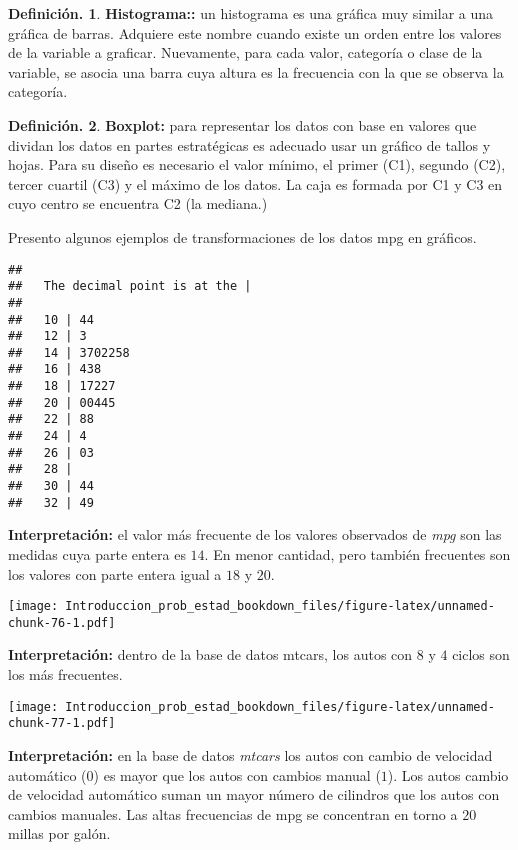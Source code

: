 \documentclass[]{book}
\theoremstyle{definition}
\newtheorem{definition}{Definición.}[chapter]
\theoremstyle{definition}
\theoremstyle{definition}
\theoremstyle{remark}
\begin{document}
\begin{definition}
\protect\hypertarget{def:unnamed-chunk-73}{}{\label{def:unnamed-chunk-73} }\textbf{Histograma::} un histograma es una gráfica muy similar a una
gráfica de barras. Adquiere este nombre cuando existe un orden
entre los valores de la variable a graficar. Nuevamente, para cada
valor, categoría o clase de la variable, se asocia una barra
cuya altura es la frecuencia con la que se observa la
categoría.
\end{definition}

\begin{definition}
\protect\hypertarget{def:unnamed-chunk-74}{}{\label{def:unnamed-chunk-74} }\textbf{Boxplot:} para representar los datos con base en valores que
dividan los datos en partes estratégicas es
adecuado usar un gráfico de tallos y hojas. Para su
diseño es necesario el valor mínimo, el primer
(C1), segundo (C2), tercer cuartil (C3) y el máximo de
los datos. La caja es formada por C1 y C3
en cuyo centro se encuentra C2 (la mediana.)
\end{definition}

Presento algunos ejemplos de transformaciones de los datos mpg en
gráficos.

\begin{verbatim}
## 
##   The decimal point is at the |
## 
##   10 | 44
##   12 | 3
##   14 | 3702258
##   16 | 438
##   18 | 17227
##   20 | 00445
##   22 | 88
##   24 | 4
##   26 | 03
##   28 | 
##   30 | 44
##   32 | 49
\end{verbatim}

\textbf{Interpretación:} el valor más frecuente de los valores observados
de \emph{mpg} son las medidas cuya parte entera es \(14\). En menor cantidad,
pero también frecuentes son los valores con parte entera igual a \(18\)
y \(20\).

\texttt{[image: Introduccion\_prob\_estad\_bookdown\_files/figure-latex/unnamed-chunk-76-1.pdf]}

\textbf{Interpretación:} dentro de la base de datos mtcars, los autos con
\(8\) y \(4\) ciclos son los más frecuentes.

\texttt{[image: Introduccion\_prob\_estad\_bookdown\_files/figure-latex/unnamed-chunk-77-1.pdf]}

\textbf{Interpretación:} en la base de datos \emph{mtcars} los autos con cambio
de velocidad automático (\(0\)) es mayor que los autos con cambios
manual (\(1\)). Los autos cambio de velocidad automático suman un mayor
número de cilindros que los autos con cambios manuales. Las altas
frecuencias de mpg se concentran en torno a \(20\) millas por galón.
\end{document}
